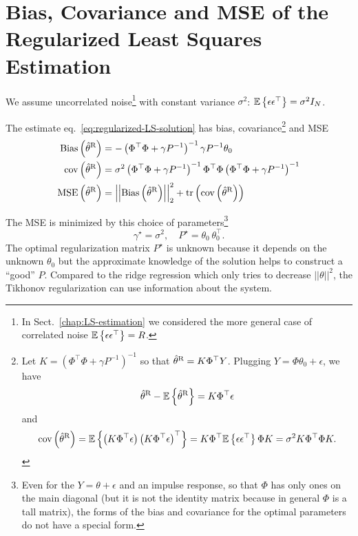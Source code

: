 \section{Bias, Covariance and MSE of the Regularized Least Squares Estimation}
\label{sec:bias-covariance-MSE-regLS-estimation}

We assume uncorrelated noise\footnote{In Sect.~\ref{chap:LS-estimation} we considered the more general case of correlated noise $\mathbb{E}\left\{\epsilon \epsilon^\top\right\} = R$.} with constant variance $\sigma^2$: $\mathbb{E}\left\{\epsilon \epsilon^\top\right\} = \sigma^2I_N$.

The estimate eq.~\eqref{eq:regularized-LS-solution} has bias, covariance\footnote{Let $K = \left(\Phi^\top\Phi + \gamma P^{-1}\right)^{-1}$ so that $\hat{\theta}^\textrm{R} = K\Phi^\top Y$. Plugging $Y=\Phi\theta_0+\epsilon$, we have
  \begin{equation*}
    \hat{\theta}^\textrm{R} - \mathbb{E}\left\{\hat{\theta}^\textrm{R}\right\} = K\Phi^\top\epsilon
  \end{equation*}
  and
  \begin{equation*}
    \textrm{cov}\left(\hat{\theta}^\textrm{R}\right) = \mathbb{E}\left\{\left(K\Phi^\top\epsilon\right) \left(K\Phi^\top\epsilon\right)^\top\right\} = K\Phi^\top \mathbb{E}\left\{\epsilon\epsilon^\top\right\} \Phi K = \sigma^2 K\Phi^\top\Phi K.
  \end{equation*}} and MSE
\begin{align*}
  \textrm{Bias}\left(\hat{\theta}^\textrm{R}\right) &= -\left(\Phi^\top\Phi + \gamma P^{-1}\right)^{-1}\gamma P^{-1}\theta_0 \\
  \textrm{cov}\left(\hat{\theta}^\textrm{R}\right) &= \sigma^2 \left(\Phi^\top\Phi + \gamma P^{-1}\right)^{-1} \Phi^\top\Phi \left(\Phi^\top\Phi + \gamma P^{-1}\right)^{-1} \\
  \textrm{MSE}\left(\hat{\theta}^\textrm{R}\right) &= \left|\left|\textrm{Bias}\left(\hat{\theta}^\textrm{R}\right)\right|\right|_2^2 + \textrm{tr}\left(\textrm{cov}\left(\hat{\theta}^\textrm{R}\right)\right)
\end{align*}

The MSE is minimized by this choice of parameters\footnote{Even for the $Y=\theta+\epsilon$ and an impulse response, so that $\Phi$ has only ones on the main diagonal (but it is not the identity matrix because in general $\Phi$ is a tall matrix), the forms of the bias and covariance for the optimal parameters do not have a special form.}
\begin{equation*}
  \gamma^\star = \sigma^2,\hspace{1em} P^\star = \theta_0^{\phantom{\top}} \theta_0^\top.
\end{equation*}
The optimal regularization matrix $P^\star$ is unknown because it depends on the unknown $\theta_0$ but the approximate knowledge of the solution helps to construct a ``good'' $P$. Compared to the ridge regression which only tries to decrease $||\theta||^2$, the Tikhonov regularization can use information about the system.

